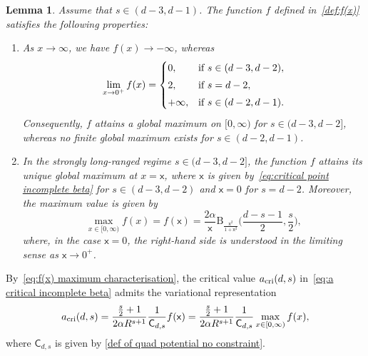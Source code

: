 \documentclass{amsart}
\theoremstyle{plain}
\newtheorem{lem}[thm]{Lemma}
\theoremstyle{remark}
\numberwithin{equation}{section}
\begin{document}
\begin{lem} \label{lem: property f(x)}
Assume that $s\in(d-3,d-1)$. The function $f$ defined in~\eqref{def:f(x)} satisfies the following properties: 
\begin{enumerate}[label=\textup{(\roman*)}]
    \item \label{item: limits f(x)}
  As $x\to\infty$, we have $f(x)\to-\infty$, whereas 
    \begin{equation}
         \lim_{x\to 0^+}f(x)=  
        \begin{cases}
            0, &\textup{if } s \in (d-3,d-2),
            \smallskip 
            \\
            2, &\textup{if } s= d-2,
            \smallskip 
            \\
            +\infty, &\textup{if } s\in (d-2,d-1).
        \end{cases}
    \end{equation}
    Consequently, $f$ attains a global maximum on $[0,\infty)$ for $s\in(d-3,d-2]$, whereas no finite global maximum exists for $s\in(d-2,d-1)$. 
    \smallskip 
    \item \label{item: maximum existence}
    In the strongly long-ranged regime $s\in(d-3,d-2]$, the function $f$ attains its unique global maximum at $x=\mathsf{x}$, where $\mathsf{x}$ is given by~\eqref{eq:critical point incomplete beta} for $s\in (d-3,d-2)$ and $\mathsf{x}=0$ for $s=d-2$.
    Moreover, the maximum value is given by
    \begin{equation}
    \label{eq:f(x) maximum characterisation}
        \max_{x\in [0,\infty)} f(x) =f(\mathsf{x})= \frac{2\alpha}{\mathsf{x}} \mathrm{B}_{\frac{\mathsf{x}^2}{1+\mathsf{x}^2}}\Big(\frac{d-s-1}{2},\frac{s}{2}\Big),
    \end{equation}
   where, in the case $\mathsf{x}=0$, the right-hand side is understood in
the limiting sense as $\mathsf{x}\to0^+$. 
\end{enumerate}
\end{lem}

By~\eqref{eq:f(x) maximum characterisation}, the critical value
$a_{\rm cri}(d,s)$ in~\eqref{eq:a critical incomplete beta} admits the
variational representation
\begin{equation} \label{a critical value in terms of max f}
    a_{\rm cri}(d,s) = \frac{ \frac{s}{2}+1 }{2\alpha R^{s+1}} \frac{1}{\mathsf{C}_{d,s} } f(\mathsf{x})=   \frac{ \frac{s}{2}+1 }{2\alpha R^{s+1}} \frac{1}{\mathsf{C}_{d,s} } \max_{x\in [0,\infty)}f(x),
\end{equation}
where $\mathsf{C}_{d,s}$ is given by \eqref{def of quad potential no constraint}. 
\end{document}
